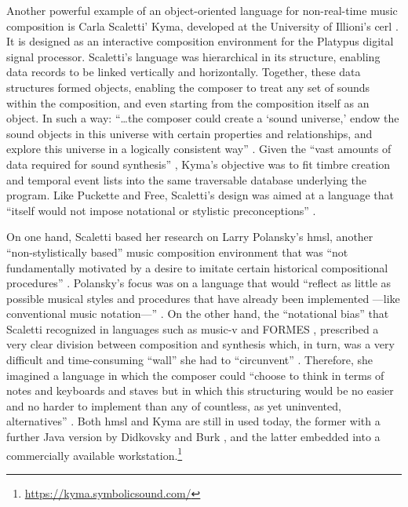 	Another powerful example of an object-oriented language for non-real-time music composition is Carla Scaletti' Kyma, developed at the University of Illioni's \gls{cerl} \parencite{DBLP:conf/icmc/Scaletti87}. It is designed as an interactive composition environment for the Platypus digital signal processor. Scaletti's language was hierarchical in its structure, enabling data records to be linked vertically and horizontally. Together, these data structures formed objects, enabling the composer to treat any set of sounds within the composition, and even starting from the composition itself as an object. In such a way: ``\dots the composer could create a `sound universe,' endow the sound objects in this universe with certain properties and relationships, and explore this universe in a logically consistent way'' \parencite[50]{DBLP:conf/icmc/Scaletti87}. Given the ``vast amounts of data required for sound synthesis'' \parencite[50]{DBLP:conf/icmc/Scaletti87}, Kyma's objective was to fit timbre creation and temporal event lists into the same traversable database underlying the program. Like Puckette and Free, Scaletti's design was aimed at a language that ``itself would not impose notational or stylistic preconceptions'' \parencite[50]{DBLP:conf/icmc/Scaletti87}.

	On one hand, Scaletti based her research on Larry Polansky's \gls{hmsl}, another ``non-stylistically based'' music composition environment that was ``not fundamentally motivated by a desire to imitate certain historical compositional procedures'' \parencite[224]{DBLP:conf/icmc/RosenboomP85}. Polansky's focus was on a language that would ``reflect as little as possible musical styles and procedures that have already been implemented ---like conventional music notation---'' \parencite[224]{DBLP:conf/icmc/RosenboomP85}. On the other hand, the ``notational bias'' \parencite[49]{DBLP:conf/icmc/Scaletti87} that Scaletti recognized in languages such as \gls{music-v} and FORMES \parencite{DBLP:conf/icmc/RodetBCP82, DBLP:conf/icmc/BoyntonDPR86}, prescribed a very clear division between composition and synthesis which, in turn, was a very difficult and time-consuming ``wall'' she had to ``circunvent'' \parencite[49]{DBLP:conf/icmc/Scaletti87}. Therefore, she imagined a language in which the composer could ``choose to think in terms of notes and keyboards and staves but in which this structuring would be no easier and no harder to implement than any of countless, as yet uninvented, alternatives'' \parencite[49]{DBLP:conf/icmc/Scaletti87}. Both \gls{hmsl} and Kyma are still in used today, the former with a further Java version by Didkovsky and Burk \parencite{DBLP:conf/icmc/DidkovskyB01}, and the latter embedded into a commercially available workstation.\footnote{\url{https://kyma.symbolicsound.com/}}

